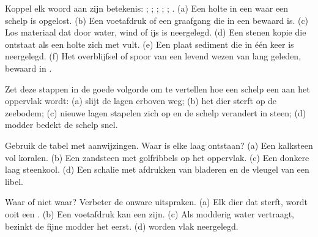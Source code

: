 \begin{exercise}[$\star$]\label{exo:g7:sediments-and-fossils:1}
Koppel elk woord aan zijn betekenis: ; ; ; ;
; . (a) Een holte in een  waar een schelp is
opgelost. (b) Een voetafdruk of een graafgang die in een  bewaard
is. (c) Los materiaal dat door water, wind of ijs is neergelegd. (d) Een
stenen kopie die ontstaat als een holte zich met  vult. (e) Een
plaat sediment die in één keer is neergelegd. (f) Het overblijfsel of
spoor van een levend wezen van lang geleden, bewaard in .
\end{exercise}

\begin{exercise}[$\star$]\label{exo:g7:sediments-and-fossils:2}
Zet deze stappen in de goede volgorde om te vertellen hoe een schelp een
 aan het oppervlak wordt: (a)  slijt de lagen erboven weg;
(b) het dier sterft op de zeebodem; (c) nieuwe lagen stapelen zich op en de
schelp verandert in steen; (d) modder bedekt de schelp snel.
\end{exercise}

\begin{exercise}[$\star$]\label{exo:g7:sediments-and-fossils:3}
Gebruik de tabel met aanwijzingen. Waar is elke laag ontstaan? (a) Een
kalksteen vol koralen. (b) Een zandsteen met golfribbels op het oppervlak.
(c) Een donkere laag steenkool. (d) Een schalie met afdrukken van bladeren
en de vleugel van een libel.
\end{exercise}

\begin{exercise}[$\star$]\label{exo:g7:sediments-and-fossils:4}
Waar of niet waar? Verbeter de onware uitspraken. (a) Elk dier dat sterft,
wordt ooit een . (b) Een voetafdruk kan een  zijn. (c) Als
modderig water vertraagt, bezinkt de fijne modder het eerst.
(d)  worden vlak neergelegd.
\end{exercise}

